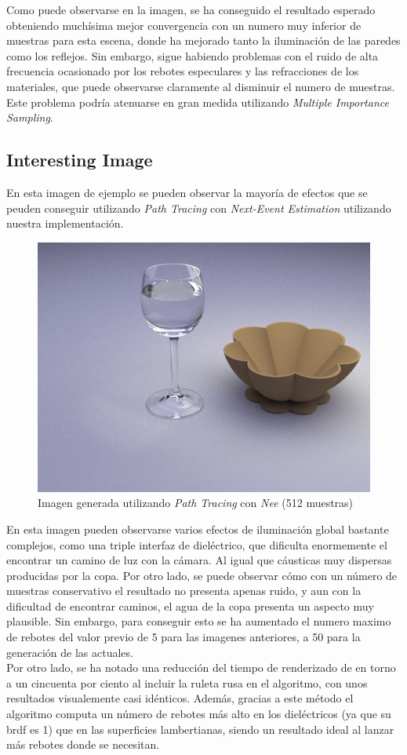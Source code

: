\documentclass[10pt,oneside,a4paper]{article}
\begin{document}
Como puede observarse en la imagen, se ha conseguido el resultado esperado obteniendo muchísima mejor convergencia con un numero muy inferior de muestras para esta escena, donde ha mejorado tanto la iluminación de las paredes como los reflejos. Sin embargo, sigue habiendo problemas con el ruido de alta frecuencia ocasionado por los rebotes especulares y las refracciones de los materiales, que puede observarse claramente al disminuir el numero de muestras. Este problema podría atenuarse en gran medida utilizando \textit{Multiple Importance Sampling}.\\
 \subsection{Interesting Image}
En esta imagen de ejemplo se pueden observar la mayoría de efectos que se peuden conseguir utilizando \textit{Path Tracing} con \textit{Next-Event Estimation} utilizando nuestra implementación.\\

\begin{figure}[h]
\centering
\includegraphics[width=.6\linewidth]{images/table_interesting_512.png}
\caption{Imagen generada utilizando \textit{Path Tracing} con \textit{Nee} (512 muestras) }
\label{fig:disp}
\end{figure}

En esta imagen pueden observarse varios efectos de iluminación global bastante complejos, como una triple interfaz de dieléctrico, que dificulta enormemente el encontrar un camino de luz con la cámara. Al igual que cáusticas muy dispersas producidas por la copa. Por otro lado, se puede observar cómo con un número de muestras conservativo el resultado no presenta apenas ruido, y aun con la dificultad de encontrar caminos, el agua de la copa presenta un aspecto muy plausible. Sin embargo, para conseguir esto se ha aumentado el numero maximo de rebotes del valor previo de 5 para las imagenes anteriores, a 50 para la generación de las actuales. \\

Por otro lado, se ha notado una reducción del tiempo de renderizado de en torno a un cincuenta por ciento al incluir la ruleta rusa en el algoritmo, con unos resultados visualemente casi idénticos. Además, gracias a este método el algoritmo computa un número de rebotes más alto en los dieléctricos (ya que su brdf es 1) que en las superficies lambertianas, siendo un resultado ideal al lanzar más rebotes donde se necesitan.
\end{document}
